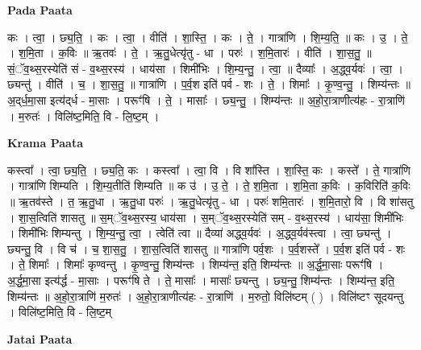 \documentclass[17pt]{extarticle}
\begin{document}
\textbf{Pada Paata} \newline

कः । त्वा॒ । छ्य॒ति॒ । कः । त्वा॒ । वीति॑ । शा॒स्ति॒ । कः । ते॒ । गात्रा॑णि । शि॒म्य॒ति॒ ॥ कः । उ॒ । ते॒ । श॒मि॒ता । क॒विः ॥ ऋ॒तवः॑ । ते॒ । ऋ॒तु॒धेत्यृ॑तु - धा । परुः॑ । श॒मि॒तारः॑ । वीति॑ । शा॒स॒तु॒ ॥ सं॒ॅव॒थ्स॒रस्येति॑ सं - व॒थ्स॒रस्य॑ । धाय॑सा । शिमी॑भिः । शि॒म्य॒न्तु॒ । त्वा॒ ॥ दैव्याः᳚ । अ॒द्ध्व॒र्यवः॑ । त्वा॒ । छ्यन्तु॑ । वीति॑ । च॒ । शा॒स॒तु॒ ॥ गात्रा॑णि । प॒र्व॒श इति॑ पर्व - शः । ते॒ । शिमाः᳚ । कृ॒ण्व॒न्तु॒ । शिम्य॑न्तः ॥ अ॒द्‌र्ध॒मा॒सा इत्य॑द्‌र्ध - मा॒साः । परूꣳ॑षि । ते॒ । मासाः᳚ । छ्य॒न्तु॒ । शिम्य॑न्तः ॥ अ॒हो॒रा॒त्राणीत्य॑हः - रा॒त्राणि॑ । म॒रुतः॑ । विलि॑ष्ट॒मिति॒ वि - लि॒ष्ट॒म् ।  \newline


\textbf{Krama Paata} \newline

कस्त्वा᳚ । त्वा॒ छ्य॒ति॒ । छ्य॒ति॒ कः । कस्त्वा᳚ । त्वा॒ वि । वि शा᳚स्ति । शा॒स्ति॒ कः । कस्ते᳚ । ते॒ गात्रा॑णि । गात्रा॑णि शिम्यति । शि॒म्य॒तीति॑ शिम्यति ॥ क उ॑ । उ॒ ते॒ । ते॒ श॒मि॒ता । श॒मि॒ता क॒विः । क॒विरिति॑ क॒विः ॥ ऋ॒तव॑स्ते । त॒ ऋ॒तु॒धा । ऋ॒तु॒धा परुः॑ । ऋ॒तु॒धेत्यृ॑तु - धा । परुः॑ शमि॒तारः॑ । श॒मि॒तारो॒ वि । वि शा॑सतु । शा॒स॒त्विति॑ शासतु ॥ स॒म्ॅव॒थ्स॒रस्य॒ धाय॑सा । स॒म्ॅव॒थ्स॒रस्येति॑ सम् - व॒थ्स॒रस्य॑ । धाय॑सा॒ शिमी॑भिः । शिमी॑भिः शिम्यन्तु । शि॒म्य॒न्तु॒ त्वा॒ । त्वेति॑ त्वा ॥ दैव्या॑ अद्ध्व॒र्यवः॑ । अ॒द्ध्व॒र्यव॑स्त्वा । त्वा॒ छ्यन्तु॑ । छ्यन्तु॒ वि । वि च॑ । च॒ शा॒स॒तु॒ । शा॒स॒त्विति॑ शासतु ॥ गात्रा॑णि पर्व॒शः । प॒र्व॒शस्ते᳚ । प॒र्व॒श इति॑ पर्व - शः । ते॒ शिमाः᳚ । शिमाः᳚ कृण्वन्तु । कृ॒ण्व॒न्तु॒ शिम्य॑न्तः । शिम्य॑न्त॒ इति॒ शिम्य॑न्तः ॥ अ॒र्द्ध॒मा॒साः परूꣳ॑षि । अ॒र्द्ध॒मा॒सा इत्य॑र्द्ध - मा॒साः । परूꣳ॑षि ते । ते॒ मासाः᳚ । मासाः᳚ छ्यन्तु । छ्य॒न्तु॒ शिम्य॑न्तः । शिम्य॑न्त॒ इति॒ शिम्य॑न्तः ॥ अ॒हो॒रा॒त्राणि॑ म॒रुतः॑ । अ॒हो॒रा॒त्राणीत्य॑हः - रा॒त्राणि॑ । म॒रुतो॒ विलि॑ष्टम् ( ) । विलि॑ष्टꣳ सूदयन्तु । विलि॑ष्ट॒मिति॒ वि - लि॒ष्ट॒म् \newline

\textbf{Jatai Paata} \newline
\end{document}
